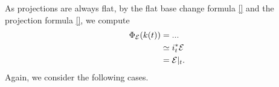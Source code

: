     
    As projections are always flat, by the flat base change formula \ref{} and the projection formula \ref{}, we compute
    \begin{align*}
        \Phi_{\mathcal E}(k(t)) &= ...\\
        & \simeq i_t^*\mathcal E \\
        & = \mathcal E|_t.
    \end{align*}
    Again, we consider the following cases. 

